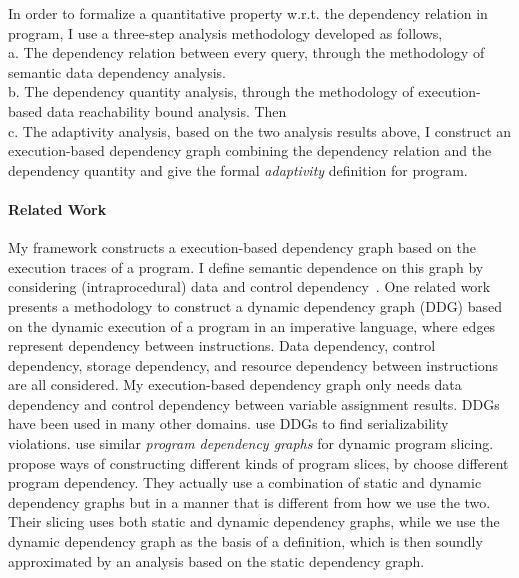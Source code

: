 
In order to formalize a quantitative property w.r.t. the dependency relation in program, I
use a three-step analysis methodology developed as follows,
\\
 a. The dependency relation between every query, through the methodology of semantic data dependency analysis.
\\
 b. The dependency quantity analysis, through the methodology of execution-based data reachability bound analysis. Then 
\\
 c. The adaptivity analysis, based on the two analysis results above, 
 I construct an execution-based dependency graph combining the dependency relation and the dependency quantity
    and give the formal \emph{adaptivity} definition 
    for program.
 \paragraph*{Related Work}
 {
My framework constructs a execution-based dependency graph based on the execution traces of a program. I define semantic dependence on this graph by considering (intraprocedural) data and control dependency~\cite{bilardi1996framework,cytron1991efficiently,pollock1989incremental}.    
One related work  
\cite{austin1992dynamic} presents a methodology to construct a dynamic dependency graph (DDG) based on the dynamic execution of a program in an imperative language, where edges represent dependency between instructions. Data dependency, control dependency, storage dependency, and resource dependency between instructions are all considered. My execution-based dependency graph only needs data dependency and control dependency between variable assignment results. 
%
DDGs have been used in many other domains. \cite{nagar2018automated} use DDGs to find serializability violations. \cite{hammer2006dynamic} use similar \emph{program dependency graphs} \cite{ferrante1987program} for dynamic program slicing.
\cite{mastroeni2008data} propose ways of constructing different kinds of program slices, by choose different program dependency. 
They actually use a combination of  
static and dynamic dependency graphs but in a manner that is different from how we use the two. Their slicing uses both static and dynamic dependency graphs, while we use the dynamic dependency graph as the basis of a definition, which is then soundly approximated by an analysis based on the static dependency graph.}

